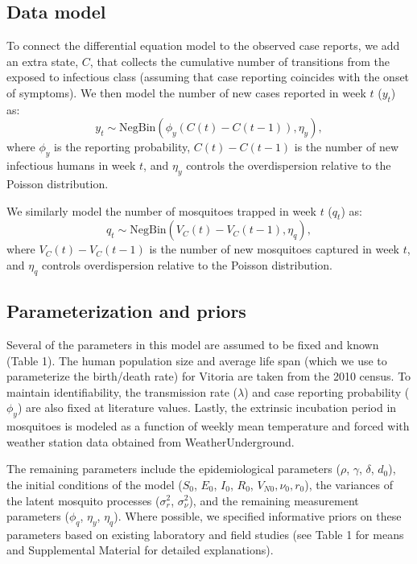 \documentclass[10pt,letterpaper]{article}
\begin{document}
\subsection*{Data model}

To connect the differential equation model to the observed case reports, we add an extra state, $C$, that collects the cumulative number of transitions from the exposed to infectious class (assuming that case reporting coincides with the onset of symptoms).
We then model the number of new cases reported in week $t$ ($y_t$) as:
\begin{equation}
y_t  \sim \text{NegBin}(\phi_y (C(t) - C(t-1)), \eta_y),
\end{equation}
where $\phi_y$ is the reporting probability, $C(t) - C(t-1)$ is the number of new infectious humans in week $t$, and $\eta_y$ controls the overdispersion relative to the Poisson distribution.

We similarly model the number of mosquitoes trapped in week $t$ ($q_t$) as:
\begin{equation}
q_t \sim \text{NegBin}(V_{C}(t) - V_{C}(t-1), \eta_q),
\end{equation}
where $V_{C}(t) - V_{C}(t-1)$ is the number of new mosquitoes captured in week $t$, and $\eta_q$ controls overdispersion relative to the Poisson distribution.

\subsection*{Parameterization and priors}

Several of the parameters in this model are assumed to be fixed and known (Table 1).
The human population size and average life span (which we use to parameterize the birth/death rate) for Vitoria are taken from the 2010 census.
To maintain identifiability, the transmission rate ($\lambda$) and case reporting probability ($\phi_y$) are also fixed at literature values.
Lastly, the extrinsic incubation period in mosquitoes is modeled as a function of weekly mean temperature and forced with weather station data obtained from WeatherUnderground.

The remaining parameters include the epidemiological parameters ($\rho$, $\gamma$, $\delta$, $d_0$), the initial conditions of the model ($S_0$, $E_0$, $I_0$, $R_0$, $V_{N0}, \nu_0, r_0$), the variances of the latent mosquito processes ($\sigma^2_r$, $\sigma^2_{\nu}$), and the remaining measurement parameters ($\phi_q$, $\eta_y$, $\eta_q$).  
Where possible, we specified informative priors on these parameters based on existing laboratory and field studies (see Table 1 for means and Supplemental Material for detailed explanations).
\end{document}

